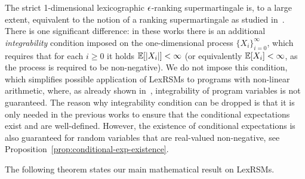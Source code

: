 The strict 1-dimensional lexicographic $\epsilon$-ranking supermartingale is, to a large extent, equivalent to the notion of a ranking supermartingale as studied in~\cite{HolgerPOPL,CFNH16:prob-termination}. There is one significant difference: in these works there is an additional \emph{integrability} condition imposed on the one-dimensional process $\{X_i\}_{i=0}^{\infty}$, which requires that for each $i\geq 0$ it holds $\mathbb{E}[|X_i|]<\infty$ (or equivalently $\mathbb{E}[X_i]<\infty$, as the process is required to be non-negative). We do not impose this condition, which simplifies possible application of LexRSMs to programs with non-linear arithmetic, where, as already shown in~\cite{HolgerPOPL}, integrability of program variables is not guaranteed.
The reason why integrability condition can be dropped is that it is only needed in the previous works to ensure that the conditional expectations exist and are well-defined. However, the existence of conditional expectations is also guaranteed for random variables that are real-valued non-negative, see Proposition~\ref{prop:conditional-exp-existence}. 

The following theorem states our main mathematical result on LexRSMs.

